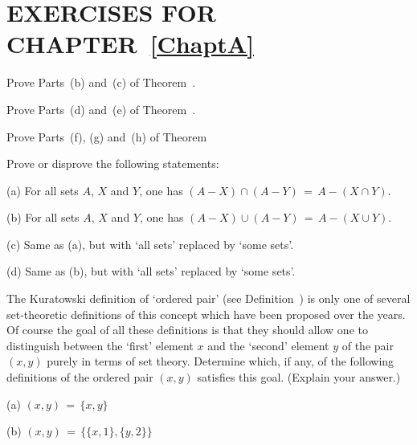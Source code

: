                         \section{EXERCISES FOR CHAPTER~\ref{ChaptA}}
                        \label{SectAEX}

\V
\V
\V
\V

\noindent \ExAa Prove Parts~(b) and~(c) of Theorem~.

\V
\V

\noindent \ExAb Prove Parts~(d) and~(e) of Theorem~.

\V
\V

\noindent \ExAc Prove Parts~(f), (g) and~(h) of Theorem~

\V
\V
 
 \noindent \ExAd Prove or disprove the following statements:

\V

        (a) For all sets $A$, $X$ and $Y$, one has
    $(A-X){\cap}(A-Y) \,=\, A-(X{\cap}Y)$.

\V

        (b) For all sets $A$, $X$ and $Y$, one has
    $(A-X){\cup}(A-Y) \,=\, A-(X{\cup}Y)$.

\V

        (c) Same as (a), but with `all sets' replaced by `some sets'.

\V


        (d) Same as (b), but with `all sets' replaced by `some sets'.


\V
\V

\noindent \ExAe The Kuratowski definition of `ordered pair' (see Definition~)
    is only one of several set-theoretic definitions of this concept which have been proposed over the years.
    Of course the goal of all these definitions is that they should allow one to distinguish between the `first' element $x$ and the `second' element $y$ of the pair $(x,y)$ purely in terms of set theory.
    Determine which, if any, of the following definitions of the ordered pair $(x,y)$ satisfies this goal.
    (Explain your answer.)

\V

        (a) $(x,y) \,=\, \{x,y\}$
        

\V

        (b) $(x,y) \,=\, \{\{x,1\},\{y,2\}\}$
        
